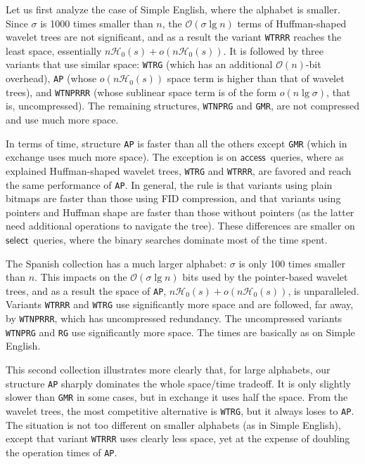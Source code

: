 \documentclass[11pt]{article}
\newcommand{\Oh}[1]
    {\ensuremath{\mathcal{O}\left( {#1} \right)}}
\newcommand{\access}
    {\ensuremath{\mathsf{access}}}
\newcommand{\select}
    {\ensuremath{\mathsf{select}}}
\newcommand{\HH}{\mathcal{H}}
\newcommand{\Ho}{\HH_0}
\begin{document}
Let us first analyze the case of Simple English, where the alphabet is
smaller. Since $\sigma$ is 1000 times smaller than $n$, the 
$\Oh{\sigma\lg n}$ terms of Huffman-shaped wavelet trees are not significant,
and as a result the variant \texttt{WTRRR} reaches the least space,
essentially $n\Ho(s)+o(n\Ho(s))$. It is followed by three variants that use
similar space: \texttt{WTRG} (which has an additional $\Oh{n}$-bit overhead),
\texttt{AP} (whose $o(n\Ho(s))$ space term is higher than that of wavelet
trees), and \texttt{WTNPRRR} (whose sublinear space term is of the form
$o(n\lg\sigma)$, that is, uncompressed). The remaining structures,
\texttt{WTNPRG} and \texttt{GMR}, are not compressed and use much more space.


In terms of time, structure \texttt{AP} is faster than all the others
except \texttt{GMR} (which in exchange uses much more space). The exception
is on \access\ queries, where as explained Huffman-shaped wavelet trees,
\texttt{WTRG} and \texttt{WTRRR}, are favored and reach the same performance
of \texttt{AP}. In general, the rule is that variants using plain bitmaps are
faster than those using FID compression, and that variants using pointers
and Huffman shape are faster than those without pointers (as the latter need
additional operations to navigate the tree). These differences are smaller on
\select\ queries, where the binary searches dominate most of the time spent.

The Spanish collection has a much larger alphabet: $\sigma$ is only 100 times
smaller than $n$. This impacts on the $\Oh{\sigma\lg n}$ bits used by the
pointer-based wavelet trees, and as a result the space of \texttt{AP},
$n\Ho(s) + o(n\Ho(s))$, is unparalleled. Variants \texttt{WTRRR} and
\texttt{WTRG} use significantly more space and are followed, far away,
by \texttt{WTNPRRR}, which has uncompressed redundancy. The
uncompressed variants \texttt{WTNPRG} and \texttt{RG} use significantly more
space. The times are basically as on Simple English.

This second collection illustrates more clearly that, for large alphabets,
our structure \texttt{AP} sharply dominates the whole space/time tradeoff.
It is only slightly slower than \texttt{GMR} in some cases, but in exchange
it uses half the space. From the wavelet trees, the most competitive alternative
is \texttt{WTRG}, but it always loses to \texttt{AP}. The situation is not too
different on smaller alphabets (as in Simple English), except that variant
\texttt{WTRRR} uses clearly less space, yet at the expense of doubling
the operation times of \texttt{AP}.
\end{document}
